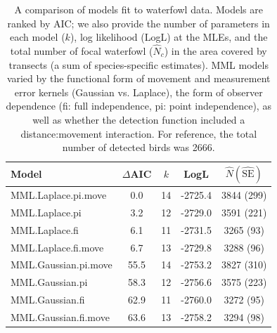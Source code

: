 \documentclass[aoas,preprint]{imsart}
\numberwithin{equation}{section}
\theoremstyle{plain}
\begin{document}
\begin{table}[ht]
\caption{A comparison of models fit to waterfowl data.  Models are ranked by AIC; we also provide the number of parameters in each model ($k$), log likelihood (LogL) at the MLEs, and the total number of focal waterfowl ($\hat{N}_c$) in the area covered by transects (a sum of species-specific estimates).  MML models varied by the functional form of movement and measurement error kernels (Gaussian vs. Laplace), the form of observer dependence (fi: full independence, pi: point independence),  as well as whether the detection function included a distance:movement interaction.  For reference, the total number of detected birds was 2666.
}
\label{tab:ests}
\raggedright
\begin{tabular}{lcccc}
  \hline
  Model & $\Delta$AIC & $k$ & LogL & $\hat{N}(\hat{\textrm{SE}})$  \\
  \hline
  MML.Laplace.pi.move & 0.0 & 14 & -2725.4 & 3844 (299) \\
  MML.Laplace.pi & 3.2 & 12 & -2729.0 & 3591 (221) \\
  MML.Laplace.fi & 6.1 & 11 & -2731.5 & 3265 (93) \\
  MML.Laplace.fi.move & 6.7 & 13 & -2729.8 & 3288 (96) \\
  MML.Gaussian.pi.move & 55.5 & 14 & -2753.2 & 3827 (310) \\
  MML.Gaussian.pi & 58.3 & 12 & -2756.6 & 3575 (223) \\
  MML.Gaussian.fi & 62.9 & 11 & -2760.0 & 3272 (95) \\
  MML.Gaussian.fi.move & 63.6 & 13 & -2758.2 & 3294 (98) \\
\hline
\end{tabular}
\end{table}
\end{document}
